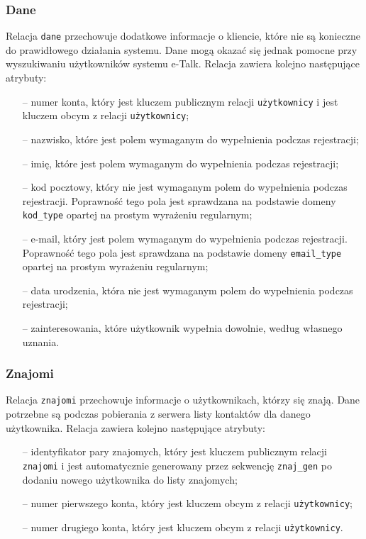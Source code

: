 \documentclass[a4paper,12pt]{article}
\begin{document}
\subsubsection[Dane]{Dane}
Relacja \texttt{dane} przechowuje dodatkowe informacje o kliencie, które nie są konieczne do prawidłowego działania systemu. Dane mogą okazać się jednak pomocne przy wyszukiwaniu użytkowników systemu e-Talk. Relacja zawiera kolejno następujące atrybuty:
\begin{itemize}
    \item[--] numer konta, który jest kluczem publicznym relacji \texttt{użytkownicy} i jest kluczem obcym z relacji \texttt{użytkownicy};
    \item[--] nazwisko, które jest polem wymaganym do wypełnienia podczas rejestracji;
    \item[--] imię, które jest polem wymaganym do wypełnienia podczas rejestracji;
    \item[--] kod pocztowy, który nie jest wymaganym polem do wypełnienia podczas rejestracji. Poprawność
              tego pola jest sprawdzana na podstawie domeny \texttt{kod\_type} opartej na prostym wyrażeniu
              regularnym;
    \item[--] e-mail, który jest polem wymaganym do wypełnienia podczas rejestracji. Poprawność
              tego pola jest sprawdzana na podstawie domeny \texttt{email\_type} opartej na prostym wyrażeniu
              regularnym;
    \item[--] data urodzenia, która nie jest wymaganym polem do wypełnienia podczas rejestracji;
    \item[--] zainteresowania, które użytkownik wypełnia dowolnie, według własnego uznania.
\end{itemize}

\subsubsection[Znajomi]{Znajomi}
Relacja \texttt{znajomi} przechowuje informacje o użytkownikach, którzy się znają. Dane potrzebne są podczas pobierania z serwera listy kontaktów dla danego użytkownika. Relacja zawiera kolejno następujące atrybuty:
\begin{itemize}
    \item[--] identyfikator pary znajomych, który jest kluczem publicznym relacji \texttt{znajomi} i jest automatycznie generowany przez sekwencję \texttt{znaj\_gen} po dodaniu nowego użytkownika do listy znajomych;
    \item[--] numer pierwszego konta, który jest kluczem obcym z relacji \texttt{użytkownicy};
    \item[--] numer drugiego konta, który jest kluczem obcym z relacji \texttt{użytkownicy}.
\end{itemize}
\end{document}
